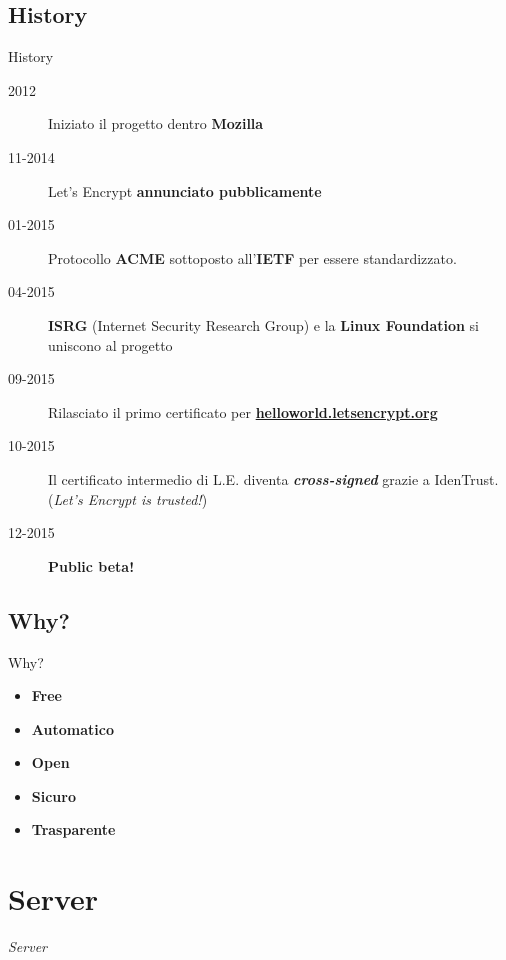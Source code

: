 \documentclass[xcolor=svgnames,11pt]{beamer}
\begin{document}
\subsection{History}
\begin{frame}{History}
\begin{description}
  \item[2012] Iniziato il progetto dentro \textbf{Mozilla}
  \pause
  \item[11-2014] Let's Encrypt \textbf{annunciato pubblicamente}
  \pause
  \item[01-2015] Protocollo \textbf{ACME} sottoposto all'\textbf{IETF} per essere standardizzato.
  \pause
  \item[04-2015] \textbf{ISRG} (Internet Security Research Group) e la \textbf{Linux Foundation}
  si uniscono al progetto
  \pause
  \item[09-2015] Rilasciato il primo certificato per \textbf{\href{https://helloworld.letsencrypt.org/}{helloworld.letsencrypt.org}}
  \pause
  \item[10-2015] Il certificato intermedio di L.E. diventa \textbf{\emph{cross-signed}} grazie a IdenTrust.
  (\emph{Let's Encrypt is trusted!})
  \pause
  \item[12-2015] \textbf{Public beta!}
\end{description}
\end{frame}

\subsection{Why?}
\begin{frame}{Why?}
\begin{itemize}
  \item \textbf{Free}
  \item \textbf{Automatico}
  \item \textbf{Open}
  \item \textbf{Sicuro}
  \item \textbf{Trasparente}
\end{itemize}
\end{frame}

\section{Server}
\begin{frame}{}
\begin{center}
\begin{Huge}
\textcolor{leorange}{\emph{Server}}
\end{Huge}
\end{center}
\end{frame}
\end{document}
